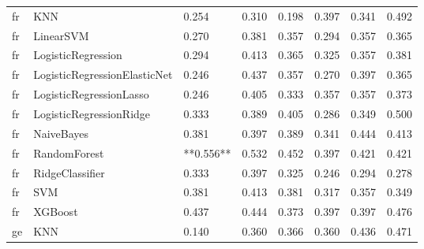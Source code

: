 \begin{tabular}{llllllll}
      fr &                          KNN &     0.254 &                     0.310 &                 0.198 &                  0.397 &                                   0.341 &     0.492 \\
      fr &                    LinearSVM &     0.270 &                     0.381 &                 0.357 &                  0.294 &                                   0.357 &     0.365 \\
      fr &           LogisticRegression &     0.294 &                     0.413 &                 0.365 &                  0.325 &                                   0.357 &     0.381 \\
      fr & LogisticRegressionElasticNet &     0.246 &                     0.437 &                 0.357 &                  0.270 &                                   0.397 &     0.365 \\
      fr &      LogisticRegressionLasso &     0.246 &                     0.405 &                 0.333 &                  0.357 &                                   0.357 &     0.373 \\
      fr &      LogisticRegressionRidge &     0.333 &                     0.389 &                 0.405 &                  0.286 &                                   0.349 &     0.500 \\
      fr &                   NaiveBayes &     0.381 &                     0.397 &                 0.389 &                  0.341 &                                   0.444 &     0.413 \\
      fr &                 RandomForest & **0.556** &                     0.532 &                 0.452 &                  0.397 &                                   0.421 &     0.421 \\
      fr &              RidgeClassifier &     0.333 &                     0.397 &                 0.325 &                  0.246 &                                   0.294 &     0.278 \\
      fr &                          SVM &     0.381 &                     0.413 &                 0.381 &                  0.317 &                                   0.357 &     0.349 \\
      fr &                      XGBoost &     0.437 &                     0.444 &                 0.373 &                  0.397 &                                   0.397 &     0.476 \\
      ge &                          KNN &     0.140 &                     0.360 &                 0.366 &                  0.360 &                                   0.436 &     0.471 \\

\end{tabular}
